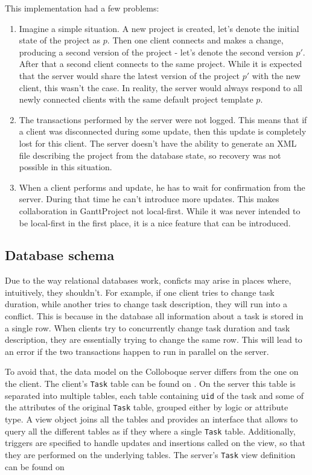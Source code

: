 \documentclass[a4paper, 11pt, oneside]{article}
\theoremstyle{definition}
\begin{document}
This implementation had a few problems:

\begin{enumerate}
    \item Imagine a simple situation. A new project is created, let's denote the initial state of the project as $p$. Then one client connects and makes a change, producing a second version of the project - let's denote the second version $p'$. After that a second client connects to the same project. While it is expected that the server would share the latest version of the project $p'$ with the new client, this wasn't the case. In reality, the server would always respond to all newly connected clients with the same default project template $p$.
    \item The transactions performed by the server were not logged. This means that if a client was disconnected during some update, then this update is completely lost for this client. The server doesn't have the ability to generate an XML file describing the project from the database state, so recovery was not possible in this situation.
    \item When a client performs and update, he has to wait for confirmation from the server. During that time he can't introduce more updates. This makes collaboration in GanttProject not local-first. While it was never intended to be local-first in the first place, it is a nice feature that can be introduced.
\end{enumerate}

\subsection{Database schema}
Due to the way relational databases work, conficts may arise in places where, intuitively, they shouldn't. For example, if one client tries to change task duration, while another tries to change task description, they will run into a conflict. This is because in the database all information about a task is stored in a single row. When clients try to concurrently change task duration and task description, they are essentially trying to change the same row. This will lead to an error if the two transactions happen to run in parallel on the server.

To avoid that, the data model on the Colloboque server differs from the one on the client. The client's \verb|Task| table can be found on . On the server this table is separated into multiple tables, each table containing \verb|uid| of the task and some of the attributes of the original \verb|Task| table, grouped either by logic or attribute type. A view object joins all the tables and provides an interface that allows to query all the different tables as if they where a single \verb|Task| table. Additionally, triggers are specified to handle updates and insertions called on the view, so that they are performed on the underlying tables. The server's \verb|Task| view definition can be found on 
\end{document}
